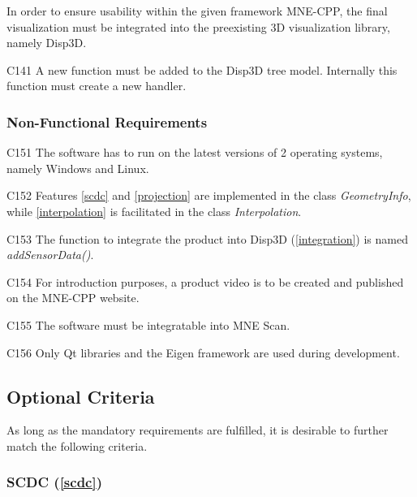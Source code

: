 	In order to ensure usability within the given framework MNE-CPP, the final visualization must be integrated into the 			preexisting 3D visualization library, namely Disp3D.
	
	\begin{aims}
		
		\item[C141] A new function must be added to the Disp3D tree model. Internally this function must create a new 								handler. 
		
	\end{aims}
	
\subsubsection{Non-Functional Requirements}		
	
	
	\begin{aims}

		\item[C151] The software has to run on the latest versions of 2 operating systems, namely Windows and Linux. 
		\item[C152] Features \ref{scdc} and \ref{projection} are implemented in the class \textit{GeometryInfo}, while \ref{interpolation} is facilitated in the class \textit{Interpolation}.
		\item[C153] The function to integrate the product into Disp3D (\ref{integration}) is named \textit{addSensorData()}.
		\item[C154] For introduction purposes, a product video is to be created and published on the MNE-CPP website.  
		\item[C155] The software must be integratable into MNE Scan. 
		\item[C156] Only Qt libraries and the Eigen framework are used during development.
	\end{aims}
	
\newpage	
	
\subsection{Optional Criteria}
	
	As long as the mandatory requirements are fulfilled, it is desirable to further match the following criteria. 	
	
\subsubsection[SCDC]{SCDC (\ref{scdc})}
	
